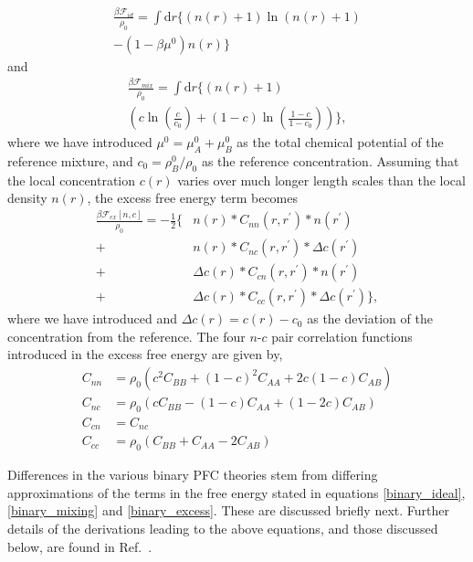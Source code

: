 \documentclass[showkeys, prb, reprint]{revtex4-1}
\newcommand{\F}{\mathcal{F}}    %
\renewcommand{\l}{\left}        %
\renewcommand{\r}{\right}       %
\newcommand{\f}{\frac}          %
\newcommand{\B}{\rho_B}         %
\newcommand{\integrate}[1]{\int\!\mathrm{d}#1}
\begin{document}
%
\begin{multline}
    \label{binary_ideal}
    \f{\beta\F_{id}}{\rho_0} =
        \integrate{r} \Big\{ \l(n(r) + 1\r)\ln\l(n(r) + 1\r) \\
    - (1 - \beta\mu^0)n(r) \Big\} 
\end{multline}
%
and
%
\begin{multline}
    \label{binary_mixing}
    \f{\beta\F_{mix}}{\rho_0} = \integrate{r} \bigg\{ (n(r) + 1) \\
    \l(c\ln\l(\f{c}{c_0}\r) + (1-c)\ln\l(\f{1-c}{1-c_0}\r) \r) \bigg\},
\end{multline}
%
where we have introduced $\mu^0=\mu_A^0+\mu_B^0$ as the total chemical
potential of the reference mixture, and $c_0 = \B^0 / \rho_0$ as the reference
concentration. Assuming that the local concentration $c(r)$ varies over much
longer length scales than the local density $n(r)$, the excess free energy term
becomes  
%
\begin{align}
    \label{binary_excess}
    \f{\beta\F_{ex}[n, c]}{\rho_0}
        = -\f{1}{2} \Big\lbrace &n(r) \ast C_{nn}(r, r^\prime) \ast n(r^\prime) \\
          + & n(r) \ast C_{nc}(r, r^\prime) \ast \Delta c(r^\prime) \nonumber \\
          + &\Delta c(r) \ast C_{cn}(r, r^\prime) \ast n(r^\prime) \nonumber \\ 
          + &\Delta c(r) \ast C_{cc}(r, r^\prime) \ast \Delta c(r^\prime) \Big\rbrace, \nonumber
\end{align}
%
where we have introduced  and $\Delta c(r) = c(r) - c_0$ as the deviation of the 
concentration from the reference.  The four $n$-$c$ pair correlation functions introduced in the  excess free energy are given by,
%
\begin{align}
    C_{nn} &= \rho_0\l(c^2 C_{BB} + (1 - c)^2C_{AA} + 2c(1-c)C_{AB}\r) \label{binaryCs}\\
    C_{nc} &= \rho_0\l(c C_{BB} - (1 - c) C_{AA} + (1 - 2c)C_{AB}\r) \\
    C_{cn} &= C_{nc} \\
    C_{cc} &= \rho_0\l(C_{BB} + C_{AA} - 2 C_{AB}\r)
\end{align}
%

Differences in the various binary PFC theories stem from differing
approximations of the terms in the free energy stated in equations 
\ref{binary_ideal}, \ref{binary_mixing} and \ref{binary_excess}. These are discussed briefly next. Further details of the derivations leading to the above equations, and those discussed below, are found in Ref.~\cite{SMITHMSC}.
\end{document}
